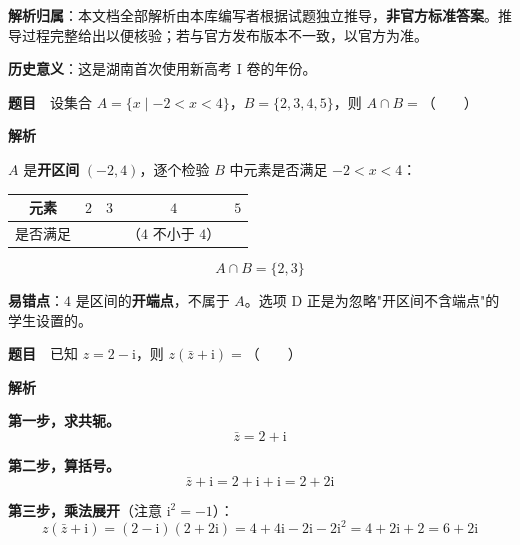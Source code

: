 

\begin{gknotice}
\textbf{解析归属}：本文档全部解析由本库编写者根据试题独立推导，\textbf{非官方标准答案}。推导过程完整给出以便核验；若与官方发布版本不一致，以官方为准。

\textbf{历史意义}：这是湖南首次使用新高考 I 卷的年份。
\end{gknotice}

\par\medskip



\textbf{题目}　设集合 $A=\{x\mid-2<x<4\}$，$B=\{2,3,4,5\}$，则 $A\cap B=$（　　）

\textbf{解析}

$A$ 是\textbf{开区间} $(-2,4)$，逐个检验 $B$ 中元素是否满足 $-2<x<4$：

\begin{center}
\begin{tabular}{ccccc}
\toprule
元素 & $2$ & $3$ & $4$ & $5$ \\
\midrule
是否满足 &  &  & （$4$ 不小于 $4$） &  \\
\bottomrule
\end{tabular}
\end{center}

\[A\cap B=\{2,3\}\]


\begin{gktip}
\textbf{易错点}：$4$ 是区间的\textbf{开端点}，不属于 $A$。选项 D 正是为忽略"开区间不含端点"的学生设置的。
\end{gktip}

\par\medskip


\textbf{题目}　已知 $z=2-\mathrm i$，则 $z(\bar z+\mathrm i)=$（　　）

\textbf{解析}

\textbf{第一步，求共轭。}
\[\bar z=2+\mathrm i\]

\textbf{第二步，算括号。}
\[\bar z+\mathrm i=2+\mathrm i+\mathrm i=2+2\mathrm i\]

\textbf{第三步，乘法展开}（注意 $\mathrm i^{2}=-1$）：
\[z(\bar z+\mathrm i)=(2-\mathrm i)(2+2\mathrm i)=4+4\mathrm i-2\mathrm i-2\mathrm i^{2}=4+2\mathrm i+2=6+2\mathrm i\]

